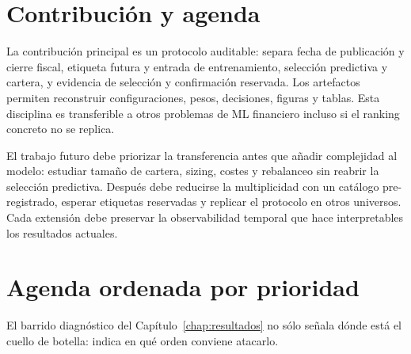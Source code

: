 \section{Contribución y agenda}

La contribución principal es un protocolo auditable: separa fecha de publicación y cierre fiscal,
etiqueta futura y entrada de entrenamiento, selección predictiva y cartera, y evidencia de selección
y confirmación reservada. Los artefactos permiten reconstruir configuraciones, pesos, decisiones,
figuras y tablas. Esta disciplina es transferible a otros problemas de ML financiero incluso si el
ranking concreto no se replica.

El trabajo futuro debe priorizar la transferencia antes que añadir complejidad al modelo: estudiar
tamaño de cartera, sizing, costes y rebalanceo sin reabrir la selección predictiva. Después debe
reducirse la multiplicidad con un catálogo pre-registrado, esperar etiquetas reservadas y replicar
el protocolo en otros universos. Cada extensión debe preservar la observabilidad temporal que hace
interpretables los resultados actuales.

\section{Agenda ordenada por prioridad}

El barrido diagnóstico del Capítulo~\ref{chap:resultados} no sólo señala dónde está el cuello de
botella: indica en qué orden conviene atacarlo.

